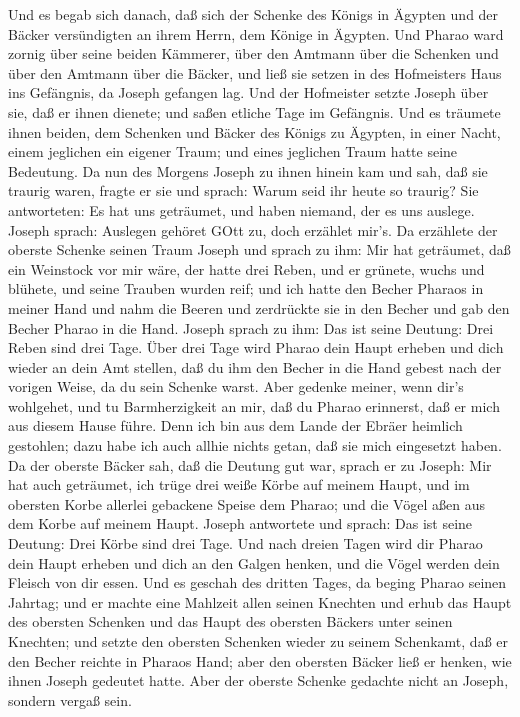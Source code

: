  Und es begab sich danach, daß sich der Schenke des Königs
in Ägypten und der Bäcker versündigten an ihrem Herrn, dem Könige in
Ägypten.  Und Pharao ward zornig über seine beiden Kämmerer,
über den Amtmann über die Schenken und über den Amtmann über die Bäcker,
 und ließ sie setzen in des Hofmeisters Haus ins Gefängnis,
da Joseph gefangen lag.  Und der Hofmeister setzte Joseph
über sie, daß er ihnen dienete; und saßen etliche Tage im Gefängnis.
 Und es träumete ihnen beiden, dem Schenken und Bäcker des
Königs zu Ägypten, in einer Nacht, einem jeglichen ein eigener Traum;
und eines jeglichen Traum hatte seine Bedeutung.  Da nun des
Morgens Joseph zu ihnen hinein kam und sah, daß sie traurig waren,
 fragte er sie und sprach: Warum seid ihr heute so traurig?
 Sie antworteten: Es hat uns geträumet, und haben niemand,
der es uns auslege. Joseph sprach: Auslegen gehöret GOtt zu, doch
erzählet mir's.  Da erzählete der oberste Schenke seinen
Traum Joseph und sprach zu ihm: Mir hat geträumet, daß ein Weinstock vor
mir wäre,  der hatte drei Reben, und er grünete, wuchs und
blühete, und seine Trauben wurden reif;  und ich hatte den
Becher Pharaos in meiner Hand und nahm die Beeren und zerdrückte sie in
den Becher und gab den Becher Pharao in die Hand.  Joseph
sprach zu ihm: Das ist seine Deutung: Drei Reben sind drei Tage.
 Über drei Tage wird Pharao dein Haupt erheben und dich
wieder an dein Amt stellen, daß du ihm den Becher in die Hand gebest
nach der vorigen Weise, da du sein Schenke warst.  Aber
gedenke meiner, wenn dir's wohlgehet, und tu Barmherzigkeit an mir, daß
du Pharao erinnerst, daß er mich aus diesem Hause führe. 
Denn ich bin aus dem Lande der Ebräer heimlich gestohlen; dazu habe ich
auch allhie nichts getan, daß sie mich eingesetzt haben. 
Da der oberste Bäcker sah, daß die Deutung gut war, sprach er zu Joseph:
Mir hat auch geträumet, ich trüge drei weiße Körbe auf meinem Haupt,
 und im obersten Korbe allerlei gebackene Speise dem
Pharao; und die Vögel aßen aus dem Korbe auf meinem Haupt. 
Joseph antwortete und sprach: Das ist seine Deutung: Drei Körbe sind
drei Tage.  Und nach dreien Tagen wird dir Pharao dein
Haupt erheben und dich an den Galgen henken, und die Vögel werden dein
Fleisch von dir essen.  Und es geschah des dritten Tages,
da beging Pharao seinen Jahrtag; und er machte eine Mahlzeit allen
seinen Knechten und erhub das Haupt des obersten Schenken und das Haupt
des obersten Bäckers unter seinen Knechten;  und setzte den
obersten Schenken wieder zu seinem Schenkamt, daß er den Becher reichte
in Pharaos Hand;  aber den obersten Bäcker ließ er henken,
wie ihnen Joseph gedeutet hatte.  Aber der oberste Schenke
gedachte nicht an Joseph, sondern vergaß sein.

